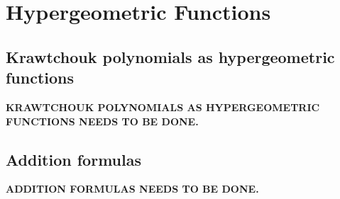 \chapter{Hypergeometric Functions}
\label{ch:15}
\section{Krawtchouk polynomials as hypergeometric functions}
\label{sec:15-1}

\noindent\textbf{KRAWTCHOUK POLYNOMIALS AS HYPERGEOMETRIC FUNCTIONS NEEDS TO BE DONE.}


\section{Addition formulas}
\label{sec:15-2}

\noindent\textbf{ADDITION FORMULAS NEEDS TO BE DONE.}


